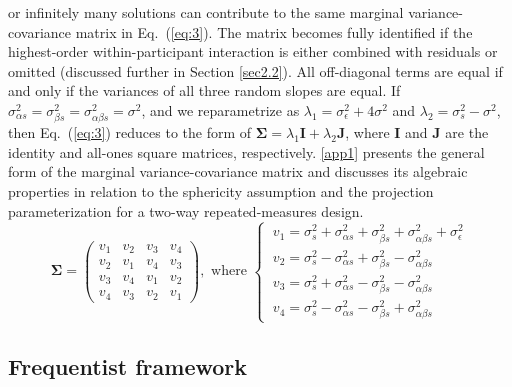 \documentclass[preprint,12pt,authoryear]{elsarticle}
\begin{document}
or infinitely many solutions can contribute to the same marginal variance-covariance matrix in Eq.~(\ref{eq:3}). The matrix becomes fully identified if the highest-order within-participant interaction is either combined with residuals or omitted (discussed further in Section \ref{sec2.2}). All off-diagonal terms are equal if and only if the variances of all three random slopes are equal. If $\sigma_{\alpha s}^2=\sigma_{\beta s}^2=\sigma_{\alpha\beta s}^2=\sigma^2$, and we reparametrize as $\lambda_1=\sigma_\epsilon^2+4\sigma^2$ and $\lambda_2=\sigma_s^2-\sigma^2$, then Eq.~(\ref{eq:3}) reduces to the form of $\boldsymbol{\Sigma}=\lambda_1\mathbf{I}+\lambda_2\mathbf{J}$, where $\mathbf{I}$ and $\mathbf{J}$ are the identity and all-ones square matrices, respectively. \ref{app1} presents the general form of the marginal variance-covariance matrix and discusses its algebraic properties in relation to the sphericity assumption and the projection parameterization for a two-way repeated-measures design.
\begin{equation} \label{eq:3}
	\boldsymbol{\Sigma}=
	\begin{pmatrix}
	v_1 & v_2 & v_3 & v_4 \\
	v_2 & v_1 & v_4 & v_3 \\
	v_3 & v_4 & v_1 & v_2 \\
	v_4 & v_3 & v_2 & v_1
	\end{pmatrix}, \text{ where }
	\begin{cases}
	\ v_1=\sigma_s^2+\sigma_{\alpha s}^2+\sigma_{\beta s}^2+\sigma_{\alpha\beta s}^2+\sigma_\epsilon^2 \\
	\ v_2=\sigma_s^2-\sigma_{\alpha s}^2+\sigma_{\beta s}^2-\sigma_{\alpha\beta s}^2 \\
	\ v_3=\sigma_s^2+\sigma_{\alpha s}^2-\sigma_{\beta s}^2-\sigma_{\alpha\beta s}^2 \\
	\ v_4=\sigma_s^2-\sigma_{\alpha s}^2-\sigma_{\beta s}^2+\sigma_{\alpha\beta s}^2
	\end{cases}
\end{equation}


\subsection{Frequentist framework}
\label{sec2.1}
\end{document}
